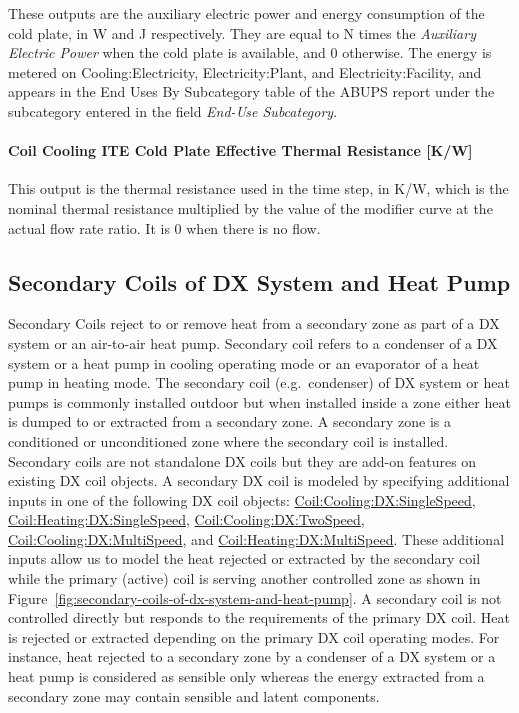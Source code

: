 These outputs are the auxiliary electric power and energy consumption of the cold plate, in W and J respectively. They are equal to N times the \emph{Auxiliary Electric Power} when the cold plate is available, and 0 otherwise. The energy is metered on Cooling:Electricity, Electricity:Plant, and Electricity:Facility, and appears in the End Uses By Subcategory table of the ABUPS report under the subcategory entered in the field \emph{End-Use Subcategory}.

\paragraph{Coil Cooling ITE Cold Plate Effective Thermal Resistance {[}K/W{]}}\label{coil-cooling-ite-cold-plate-effective-thermal-resistance-kw}

This output is the thermal resistance used in the time step, in K/W, which is the nominal thermal resistance multiplied by the value of the modifier curve at the actual flow rate ratio. It is 0 when there is no flow.

\subsection{Secondary Coils of DX System and Heat Pump}\label{secondary-coils-of-dx-system-and-heat-pump}

Secondary Coils reject to or remove heat from a secondary zone as part of a DX system or an air-to-air heat pump. Secondary coil refers to a condenser of a DX system or a heat pump in cooling operating mode or an evaporator of a heat pump in heating mode. The secondary coil (e.g.~condenser) of DX system or heat pumps is commonly installed outdoor but when installed inside a zone either heat is dumped to or extracted from a secondary zone. A secondary zone is a conditioned or unconditioned zone where the secondary coil is installed. Secondary coils are not standalone DX coils but they are add-on features on existing DX coil objects. A secondary DX coil is modeled by specifying additional inputs in one of the following DX coil objects: \hyperref[coilcoolingdxsinglespeed]{Coil:Cooling:DX:SingleSpeed}, \hyperref[coilheatingdxsinglespeed]{Coil:Heating:DX:SingleSpeed}, \hyperref[coilcoolingdxtwospeed]{Coil:Cooling:DX:TwoSpeed}, \hyperref[coilcoolingdxmultispeed]{Coil:Cooling:DX:MultiSpeed}, and \hyperref[coilheatingdxmultispeed]{Coil:Heating:DX:MultiSpeed}. These additional inputs allow us to model the heat rejected or extracted by the secondary coil while the primary (active) coil is serving another controlled zone as shown in Figure~\ref{fig:secondary-coils-of-dx-system-and-heat-pump}. A secondary coil is not controlled directly but responds to the requirements of the primary DX coil. Heat is rejected or extracted depending on the primary DX coil operating modes. For instance, heat rejected to a secondary zone by a condenser of a DX system or a heat pump is considered as sensible only whereas the energy extracted from a secondary zone may contain sensible and latent components.

